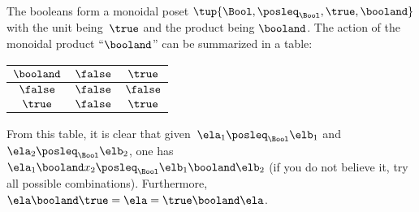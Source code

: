 \begin{example}
    The booleans form a monoidal poset $\tup{\Bool,\posleq_{\Bool},\true,\booland}$
    with the unit being~$\true$ and the product being $\booland$.
    The action of the monoidal product ``$\booland$'' can be summarized in a table:
    \begin{center}
        \begin{tabular}{c|cc}
            $\booland$ & $\false$ & $\true$  \\
            \hline
            $\false$   & $\false$ & $\false$ \\
            $\true$    & $\false$ & $\true$
        \end{tabular}
    \end{center}
    From this table, it is clear that given~$\ela_1\posleq_{\Bool}\elb_1$ and~$\ela_2\posleq_{\Bool} \elb_2$, one has~$\ela_1\booland x_2\posleq_{\Bool} \elb_1\booland \elb_2$ (if you do not believe it, try all possible combinations).
    Furthermore,~$\ela\booland \true=\ela=\true \booland \ela$.
\end{example}

\devel{}

